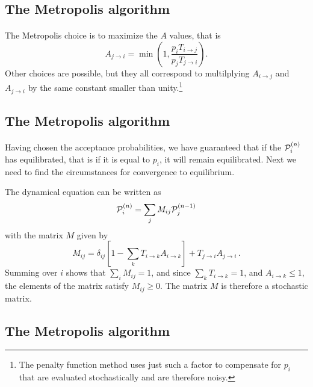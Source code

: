 \documentclass[%
twoside,                 %
final,                   %
10pt]{article}
\begin{document}
\subsection{The Metropolis algorithm}

\paragraph{}
The Metropolis choice is to maximize the $A$ values, that is
\[
A_{j \rightarrow i} = \min \left ( 1,
\frac{p_iT_{i\rightarrow j}}{ p_jT_{j\rightarrow i}}\right ).
\]
Other choices are possible, but they all correspond to multilplying
$A_{i\rightarrow j}$ and $A_{j\rightarrow i}$ by the same constant
smaller than unity.\footnote{The penalty function method uses just such
a factor to compensate for $p_i$ that are evaluated stochastically
and are therefore noisy.}



\subsection{The Metropolis algorithm}

\paragraph{}
Having chosen the acceptance probabilities, we have guaranteed that
if the  ${\cal P}_i^{(n)}$ has equilibrated, that is if it is equal to $p_i$,
it will remain equilibrated. Next we need to find the circumstances for
convergence to equilibrium.

The dynamical equation can be written as
\[
{\cal P}^{(n)}_i = \sum_j M_{ij}{\cal P}^{(n-1)}_j
\]
with the matrix $M$ given by
\[
M_{ij} = \delta_{ij}\left [ 1 -\sum_k T_{i\rightarrow k} A_{i \rightarrow k}
\right ] + T_{j\rightarrow i} A_{j\rightarrow i} \,.
\]
Summing over $i$ shows that $\sum_i M_{ij} = 1$, and since
$\sum_k T_{i\rightarrow k} = 1$, and $A_{i \rightarrow k} \leq 1$, the
elements of the matrix satisfy $M_{ij} \geq 0$. The matrix $M$ is therefore
a stochastic matrix.




\subsection{The Metropolis algorithm}
\end{document}
